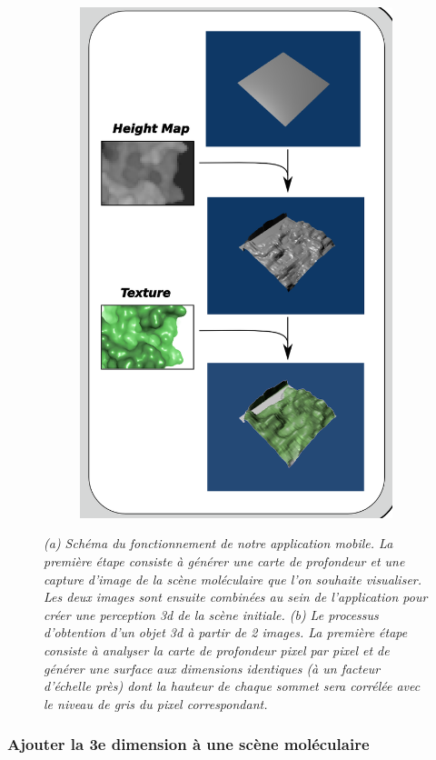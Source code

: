 \begin{figure}[h]
\begin{subfigure}{.5\textwidth}
  {\includegraphics[width=.75\linewidth]{./figures/ch3/heightmap_texture_unity}}
    \caption{}
  \label{Fig:heightmap_texture_unity}
\end{subfigure}
\caption[(a) Schéma du fonctionnement de notre application mobile. (b) Processus d'obtention d'un objet 3d à partir de 2 images.]{{\it (a) Schéma du fonctionnement de notre application mobile. La première étape consiste à générer une carte de profondeur et une capture d'image de la scène moléculaire que l'on souhaite visualiser. Les deux images sont ensuite combinées au sein de l'application pour créer une perception 3d de la scène initiale.
(b) Le processus d'obtention d'un objet 3d à partir de 2 images. La première étape consiste à analyser la carte de profondeur pixel par pixel et de générer une surface aux dimensions identiques (à un facteur d'échelle près) dont la hauteur de chaque sommet sera corrélée avec le niveau de gris du pixel correspondant.}}
\end{figure}

\subsubsection{Ajouter la 3e dimension à une scène moléculaire}

